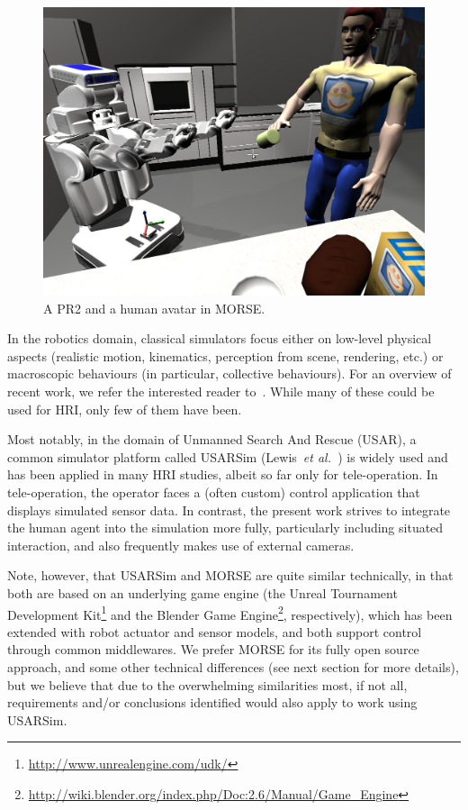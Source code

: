 \documentclass[conference]{IEEEtran}
\newcommand{\etal}{{\textit{et al.~}}}
\begin{document}
\begin{figure}[ht!]
      \centering 
      \includegraphics[width=0.9\linewidth]{morse_pr2.jpg}
      \caption{A PR2 and a human avatar in MORSE.}
      \label{fig|morse-hri}
\end{figure}

In the robotics domain, classical simulators focus either on low-level physical
aspects (realistic motion, kinematics, perception from scene, rendering, etc.) 
or macroscopic behaviours (in particular, collective behaviours). For an overview
of recent work, we refer the interested reader to~\cite{Ando2010}. While many
of these could be used for HRI, only few of them have been.

Most notably, in the domain of Unmanned Search And Rescue (USAR), a common
simulator platform called USARSim (Lewis~\etal\cite{lewis2007usarsim}) is widely
used and has been applied in many HRI studies, albeit so far only for 
tele-operation. In tele-operation, the operator faces a (often custom) control 
application that displays simulated sensor data. In contrast, the present work
strives to integrate the human agent into the simulation more fully, 
particularly including situated interaction, and also frequently makes use of
external cameras.

Note, however, that USARSim and MORSE are quite similar technically, in that
both are based on an underlying game engine (the Unreal Tournament Development
Kit\footnote{\url{http://www.unrealengine.com/udk/}} and the Blender Game Engine\footnote{\url{http://wiki.blender.org/index.php/Doc:2.6/Manual/Game_Engine}}, respectively), which has been extended 
with robot actuator and sensor models, and both support control through common
middlewares. We prefer MORSE for its fully open source approach, and some
other technical differences (see next section for more details), but we believe
that due to the overwhelming similarities most, if not all, requirements and/or
conclusions identified would also apply to work using USARSim.
\end{document}
